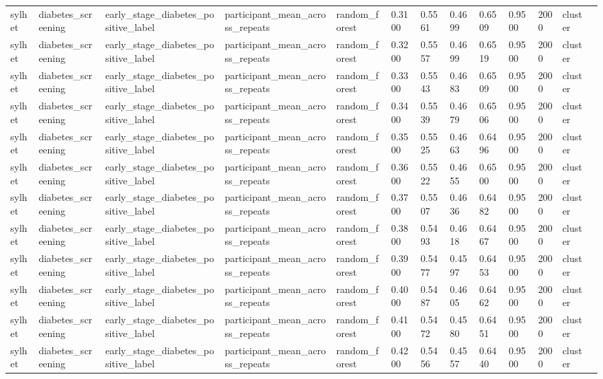 \begin{tabular}{lllllllllllll}
sylhet & diabetes\_screening & early\_stage\_diabetes\_positive\_label & participant\_mean\_across\_repeats & random\_forest & 0.3100 & 0.5561 & 0.4699 & 0.6509 & 0.9500 & 2000 & cluster &  \\
sylhet & diabetes\_screening & early\_stage\_diabetes\_positive\_label & participant\_mean\_across\_repeats & random\_forest & 0.3200 & 0.5557 & 0.4699 & 0.6519 & 0.9500 & 2000 & cluster &  \\
sylhet & diabetes\_screening & early\_stage\_diabetes\_positive\_label & participant\_mean\_across\_repeats & random\_forest & 0.3300 & 0.5543 & 0.4683 & 0.6509 & 0.9500 & 2000 & cluster &  \\
sylhet & diabetes\_screening & early\_stage\_diabetes\_positive\_label & participant\_mean\_across\_repeats & random\_forest & 0.3400 & 0.5539 & 0.4679 & 0.6506 & 0.9500 & 2000 & cluster &  \\
sylhet & diabetes\_screening & early\_stage\_diabetes\_positive\_label & participant\_mean\_across\_repeats & random\_forest & 0.3500 & 0.5525 & 0.4663 & 0.6496 & 0.9500 & 2000 & cluster &  \\
sylhet & diabetes\_screening & early\_stage\_diabetes\_positive\_label & participant\_mean\_across\_repeats & random\_forest & 0.3600 & 0.5522 & 0.4655 & 0.6500 & 0.9500 & 2000 & cluster &  \\
sylhet & diabetes\_screening & early\_stage\_diabetes\_positive\_label & participant\_mean\_across\_repeats & random\_forest & 0.3700 & 0.5507 & 0.4636 & 0.6482 & 0.9500 & 2000 & cluster &  \\
sylhet & diabetes\_screening & early\_stage\_diabetes\_positive\_label & participant\_mean\_across\_repeats & random\_forest & 0.3800 & 0.5493 & 0.4618 & 0.6467 & 0.9500 & 2000 & cluster &  \\
sylhet & diabetes\_screening & early\_stage\_diabetes\_positive\_label & participant\_mean\_across\_repeats & random\_forest & 0.3900 & 0.5477 & 0.4597 & 0.6453 & 0.9500 & 2000 & cluster &  \\
sylhet & diabetes\_screening & early\_stage\_diabetes\_positive\_label & participant\_mean\_across\_repeats & random\_forest & 0.4000 & 0.5487 & 0.4605 & 0.6462 & 0.9500 & 2000 & cluster &  \\
sylhet & diabetes\_screening & early\_stage\_diabetes\_positive\_label & participant\_mean\_across\_repeats & random\_forest & 0.4100 & 0.5472 & 0.4580 & 0.6451 & 0.9500 & 2000 & cluster &  \\
sylhet & diabetes\_screening & early\_stage\_diabetes\_positive\_label & participant\_mean\_across\_repeats & random\_forest & 0.4200 & 0.5456 & 0.4557 & 0.6440 & 0.9500 & 2000 & cluster &  \\

\end{tabular}
